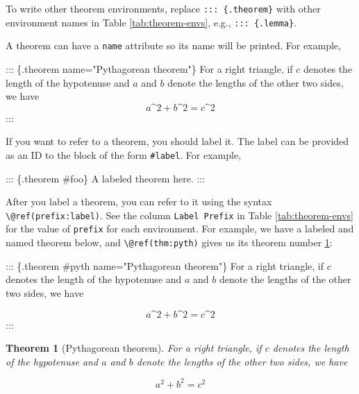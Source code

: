 \documentclass[
  12pt,
]{krantz}
\newenvironment{Shaded}{\begin{snugshade}}{\end{snugshade}}
\newcommand{\NormalTok}[1]{#1}
\newtheorem{theorem}{Theorem}[chapter]
\theoremstyle{definition}
\theoremstyle{definition}
\theoremstyle{definition}
\theoremstyle{definition}
\theoremstyle{remark}
\begin{document}
To write other theorem environments, replace \texttt{:::\ \{.theorem\}} with other environment names in Table \ref{tab:theorem-envs}, e.g., \texttt{:::\ \{.lemma\}}.

A theorem can have a \texttt{name} attribute so its name will be printed. For example,

\begin{Shaded}
\begin{Highlighting}[]
\NormalTok{::: \{.theorem name="Pythagorean theorem"\}}
\NormalTok{For a right triangle, if $c$ denotes the length of the hypotenuse}
\NormalTok{and $a$ and $b$ denote the lengths of the other two sides, we have}
\NormalTok{$$a\^{}2 + b\^{}2 = c\^{}2$$}
\NormalTok{:::}
\end{Highlighting}
\end{Shaded}

If you want to refer to a theorem, you should label it. The label can be provided as an ID to the block of the form \texttt{\#label}. For example,

\begin{Shaded}
\begin{Highlighting}[]
\NormalTok{::: \{.theorem \#foo\}}
\NormalTok{A labeled theorem here.}
\NormalTok{:::}
\end{Highlighting}
\end{Shaded}

After you label a theorem, you can refer to it using the syntax \texttt{\textbackslash{}@ref(prefix:label)}. See the column \texttt{Label\ Prefix} in Table \ref{tab:theorem-envs} for the value of \texttt{prefix} for each environment. For example, we have a labeled and named theorem below, and \texttt{\textbackslash{}@ref(thm:pyth)} gives us its theorem number \ref{thm:pyth}:

\begin{Shaded}
\begin{Highlighting}[]
\NormalTok{::: \{.theorem \#pyth name="Pythagorean theorem"\}}
\NormalTok{For a right triangle, if $c$ denotes the length of the hypotenuse}
\NormalTok{and $a$ and $b$ denote the lengths of the other two sides, we have}

\NormalTok{$$a\^{}2 + b\^{}2 = c\^{}2$$}
\NormalTok{:::}
\end{Highlighting}
\end{Shaded}

\begin{theorem}[Pythagorean theorem]
\protect\hypertarget{thm:pyth}{}\label{thm:pyth}For a right triangle, if \(c\) denotes the length of the hypotenuse
and \(a\) and \(b\) denote the lengths of the other two sides, we have

\[a^2 + b^2 = c^2\]
\end{theorem}
\end{document}
